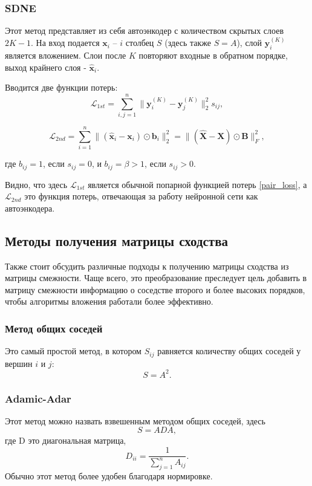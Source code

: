 \documentclass[12pt,a4paper]{extarticle}
\newcommand{\Loss}{\mathcal{L}}
\begin{document}
    \subsubsection{SDNE \cite{sdne}}
    
    Этот метод представляет из себя автоэнкодер с количеством скрытых слоев $2K - 1$. На вход подается $\mathbf{x}_i$ -- $i$ столбец $S$ (здесь также $S = A$), слой $\mathbf{y}_i^{(K)}$ является вложением. Слои после $K$ повторяют входные в обратном порядке, выход крайнего слоя - $\mathbf{\hat{x}}_i$.
    
    Вводится две функции потерь:
    $$
    \Loss_{1st} = \sum_{i,j=1}^{n} \lVert \mathbf{y}_i^{(K)} - \mathbf{y}_j^{(K)} \rVert_2^2 s_{ij},
    $$
    
    $$
    \Loss_{2nd} = \sum_{i=1}^{n} \lVert (\mathbf{\hat{x}}_i - \mathbf{x}_i) \odot \mathbf{b}_i \rVert_2^2 = \lVert (\mathbf{\hat{X}} - \mathbf{X}) \odot \mathbf{B} \rVert^2_F,
    $$
    
    где $b_{ij} = 1$, если $s_{ij} = 0$, и $b_{ij} = \beta > 1$, если $s_{ij} > 0$.
    
    Видно, что здесь $\Loss_{1st}$ является обычной попарной функцией потерь \eqref{pair_loss}, а $\Loss_{2nd}$ это функция потерь, отвечающая за работу нейронной сети как автоэнкодера.

    
    \subsection{Методы получения матрицы сходства}
    Также стоит обсудить различные подходы к получению матрицы сходства из матрицы смежности.
    Чаще всего, это преобразование преследует цель добавить в матрицу смежности информацию о соседстве второго и более высоких порядков, чтобы алгоритмы вложения работали более эффективно.
    \subsubsection{Метод общих соседей}
    Это самый простой метод, в котором $S_{ij}$ равняется количеству общих соседей у вершин $i$ и $j$:
    \[S = A^2.\]
    \subsubsection{Adamic-Adar}
    Этот метод можно назвать взвешенным методом общих соседей, здесь
    \[S = A D A,\]
    где D это диагональная матрица,
    \[D_{ii} = \frac{1}{\sum_{j=1}^n A_{ij}}.\]
    Обычно этот метод более удобен благодаря нормировке.
    
\end{document}
